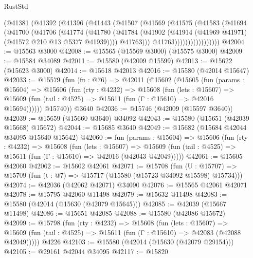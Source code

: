 \begin{lexlean}{RustStd}
\begin{coremodule}
                  (@41381
                    (@41392
                      (@41396
                        (@41443
                          (@41507
                            (@41569
                              (@41575
                                (@41583
                                  (@41694
                                    (@41700
                                      (@41706
                                        (@41774
                                          (@41780
                                            (@41784
                                              (@41902
                                                (@41914
                                                  (@41969 @41971)
                                                  (@41572 @210 @13 @5377 @41939))))
                                            @41763)))
                                      @41763)))))))))))))))))
@42004 := @15563 @3000
@42008 := @15565 (@15569 @3000) (@15575 @3000)
@42009 := @15584 @34089
@42011 := @15580 (@42009 @15599)
@42013 := @15622 (@15623 @3000)
@42014 := @15618 @42013
@42016 := @15580 (@42014 @15647)
@42033 := @15579
    (fun (fn : @76) =>
    @42011
      (@15602
        (@15605
          (fun (params : @15604) =>
          @15606
            (fun (rty : @4232) =>
            @15608
              (fun (lets : @15607) =>
              @15609 (fun (tail : @4525) => @15611 (fun (Γ : @15610) => @42016 @15694))))))
        @15740))
    @3640
@42036 := @15746 (@42009 (@15597 @3640))
@42039 := @15659 (@15660 @3640) @34092
@42043 := @15580 (@15651 (@42039 @15668) @15672)
@42044 := @15685 @3640
@42049 := @15682 (@15684 @42044 @34095 @15640 @15642)
@42060 := fun (params : @15604) =>
  @15606
    (fun (rty : @4232) =>
    @15608
      (fun (lets : @15607) =>
      @15609 (fun (tail : @4525) => @15611 (fun (Γ : @15610) => @42016 (@42043 @42049)))))
@42061 := @15605 @42060
@42062 := @15602 @42061
@42071 := @15708
    (fun (U : @15707) => @15709 (fun (t : @7) => @15717 (@15580 (@15723 @34092 @15598) @15734)))
@42074 := @42036 (@42062 @42071) @34090
@42076 := @15565 @42061 @42071
@42078 := @15795 @42060 @11498
@42079 := @15632 @11498
@42083 := @15580 (@42014 (@15630 (@42079 @15645)))
@42085 := @42039 (@15667 @11498)
@42086 := @15651 @42085
@42088 := @15580 (@42086 @15672)
@42099 := @15798
    (fun (rty : @4232) =>
    @15608
      (fun (lets : @15607) =>
      @15609 (fun (tail : @4525) => @15611 (fun (Γ : @15610) => @42083 (@42088 @42049)))))
    @4226
@42103 := @15580 (@42014 (@15630 (@42079 @29154)))
@42105 := @29161 @42044 @34095
@42117 := @15820

\end{coremodule}
\end{lexlean}

